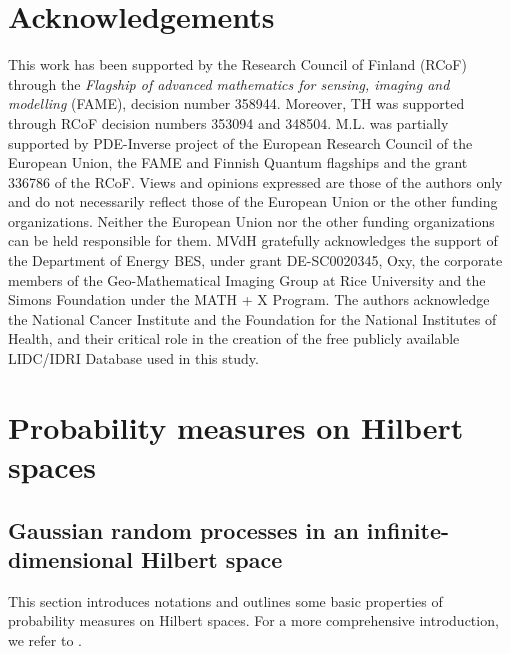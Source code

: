 \documentclass[10pt]{article} %
\theoremstyle{plain}
\theoremstyle{definition}
\theoremstyle{remark}
\begin{document}
\section*{Acknowledgements}

This work has been supported by the Research Council of Finland (RCoF) through the \emph{Flagship of advanced mathematics for sensing, imaging and modelling} (FAME), decision number 358944. Moreover, TH was supported through RCoF decision numbers 353094 and 348504. M.L. was partially supported by PDE-Inverse project of the European Research Council of the European Union,  the FAME and Finnish Quantum flagships and the grant 336786 of the RCoF. Views and opinions expressed are those of the authors only and do not necessarily reflect those of the European Union or the other funding organizations. Neither the European Union nor the other funding organizations can be held responsible for them. MVdH gratefully acknowledges the support of the Department of Energy BES, under grant DE-SC0020345, Oxy, the corporate members of the Geo-Mathematical Imaging Group at Rice University and the Simons Foundation under the MATH + X Program. The authors acknowledge the National Cancer Institute and the Foundation for the National Institutes of Health, and their critical role in the creation of the free publicly available LIDC/IDRI Database used in this study.


 

\newpage
\appendix

\section{Probability measures on Hilbert spaces}
\label{Appendix:prob_measures}

\subsection{Gaussian random processes in an infinite-dimensional Hilbert space} %

This section introduces notations and outlines some basic properties of probability measures on Hilbert spaces. For a more comprehensive introduction, we refer to \citet{da2014stochastic,hairer2023introductionSPDE}.
\end{document}
